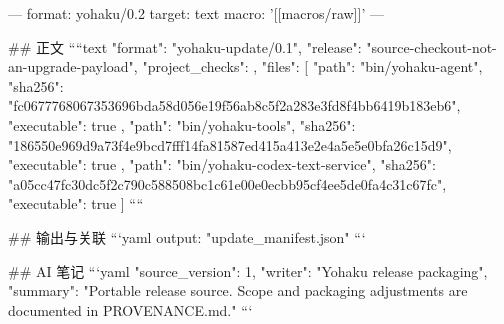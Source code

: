 ---
format: yohaku/0.2
target: text
macro: '[[macros/raw]]'
---

## 正文
````text
{
  "format": "yohaku-update/0.1",
  "release": "source-checkout-not-an-upgrade-payload",
  "project_checks": {},
  "files": [
    {
      "path": "bin/yohaku-agent",
      "sha256": "fc0677768067353696bda58d056e19f56ab8c5f2a283e3fd8f4bb6419b183eb6",
      "executable": true
    },
    {
      "path": "bin/yohaku-tools",
      "sha256": "186550e969d9a73f4e9bcd7fff14fa81587ed415a413e2e4a5e5e0bfa26c15d9",
      "executable": true
    },
    {
      "path": "bin/yohaku-codex-text-service",
      "sha256": "a05cc47fc30dc5f2c790c588508bc1c61e00e0ecbb95cf4ee5de0fa4c31c67fc",
      "executable": true
    }
  ]
}
````

## 输出与关联
```yaml
output: "update_manifest.json"
```

## AI 笔记
```yaml
{"source_version": 1, "writer": "Yohaku release packaging", "summary": "Portable release source. Scope and packaging adjustments are documented in PROVENANCE.md."}
```
